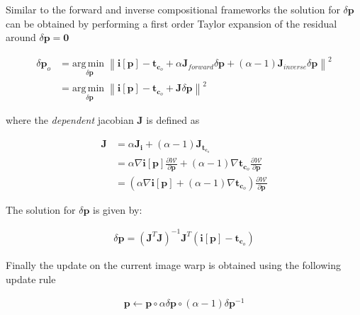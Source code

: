 Similar to the forward and inverse compositional frameworks the solution for $\delta \mathbf{p}$ can be obtained by performing a first order Taylor expansion of the residual around $\delta \mathbf{p} = \mathbf{0}$

\begin{equation}
	\begin{aligned}
		\delta \mathbf{p}_o & = \underset{\delta \mathbf{p}}{\mathrm{arg\,min\;}}
		\left\| \mathbf{i}[\mathbf{p}] - \mathbf{t}_{\mathbf{c}_o} + \alpha \mathbf{J}_{forward} \delta \mathbf{p} + (\alpha - 1) \mathbf{J}_{inverse} \delta \mathbf{p} \right\|^2
		\\
		& = \underset{\delta \mathbf{p}}{\mathrm{arg\,min\;}}
		\left\| \mathbf{i}[\mathbf{p}] - \mathbf{t}_{\mathbf{c}_o} + \mathbf{J} \delta \mathbf{p} \right\|^2
	\end{aligned}
\end{equation}

where the \emph{dependent} jacobian $\mathbf{J}$ is defined as

\begin{equation}
	\begin{aligned}
		\mathbf{J} & = \alpha \mathbf{J}_{\mathbf{i}} + (\alpha - 1) \mathbf{J}_{\mathbf{t}_{\mathbf{c}_o}}
		\\
		& = \alpha \nabla \mathbf{i}[\mathbf{p}] \frac{\partial \mathcal{W}}{\partial \mathbf{p}} + 
		(\alpha - 1) \nabla \mathbf{t}_{\mathbf{c}_o} \frac{\partial \mathcal{W}}{\partial \mathbf{p}}
		\\
		& = \left( \alpha \nabla \mathbf{i}[\mathbf{p}] + (\alpha - 1) \nabla \mathbf{t}_{\mathbf{c}_o} \right) \frac{\partial \mathcal{W}}{\partial \mathbf{p}}
	\end{aligned}
\end{equation}

The solution for $\delta \mathbf{p}$ is given by:

\begin{equation}
	\begin{aligned}
		\delta \mathbf{p} = \left( \mathbf{J}^T \mathbf{J} \right)^{-1} \mathbf{J}^T \left( \mathbf{i}[\mathbf{p}] - \mathbf{t}_{\mathbf{c}_o} \right)
	\end{aligned}
\end{equation}

Finally the update on the current image warp is obtained using the following update rule

\begin{equation}
	\begin{aligned}
		\mathbf{p} \leftarrow \mathbf{p} \circ \alpha \delta \mathbf{p} \circ (\alpha -1) \delta \mathbf{p}^{-1} 
	\end{aligned}
\end{equation}

